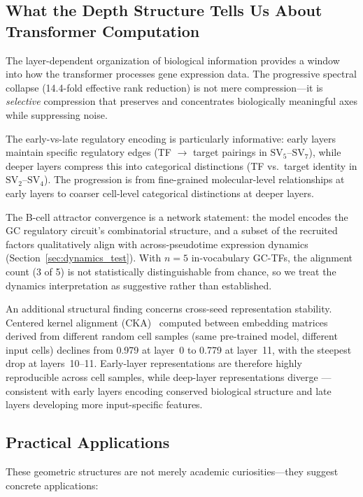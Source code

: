 \documentclass[12pt]{article}
\newcommand{\SV}[1]{\mathrm{SV}_{#1}}
\begin{document}
\subsection{What the Depth Structure Tells Us About Transformer Computation}

The layer-dependent organization of biological information provides a window into how the transformer processes gene expression data.
The progressive spectral collapse (14.4-fold effective rank reduction) is not mere compression---it is \emph{selective} compression that preserves and concentrates biologically meaningful axes while suppressing noise.

The early-vs-late regulatory encoding is particularly informative: early layers maintain specific regulatory edges (TF $\to$ target pairings in $\SV{5}$--$\SV{7}$), while deeper layers compress this into categorical distinctions (TF vs.\ target identity in $\SV{2}$--$\SV{4}$).
The progression is from fine-grained molecular-level relationships at early layers to coarser cell-level categorical distinctions at deeper layers.

The B-cell attractor convergence is a network statement: the model encodes the GC regulatory circuit's combinatorial structure, and a subset of the recruited factors qualitatively align with across-pseudotime expression dynamics (Section~\ref{sec:dynamics_test}). With $n = 5$ in-vocabulary GC-TFs, the alignment count (3 of 5) is not statistically distinguishable from chance, so we treat the dynamics interpretation as suggestive rather than established.

An additional structural finding concerns cross-seed representation stability.
Centered kernel alignment (CKA)~\cite{kornblith2019similarity} computed between embedding matrices derived from different random cell samples (same pre-trained model, different input cells) declines from 0.979 at layer~0 to 0.779 at layer~11, with the steepest drop at layers~10--11.
Early-layer representations are therefore highly reproducible across cell samples, while deep-layer representations diverge --- consistent with early layers encoding conserved biological structure and late layers developing more input-specific features.

\subsection{Practical Applications}
\label{sec:applications}

These geometric structures are not merely academic curiosities---they suggest concrete applications:
\end{document}
